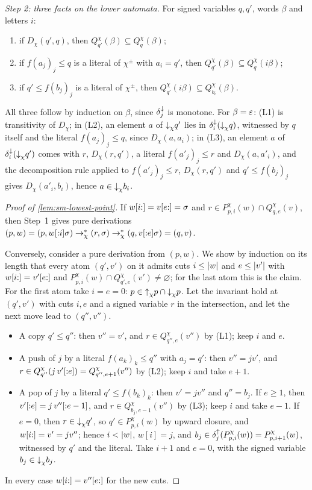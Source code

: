 \emph{Step 2: three facts on the lower automata.} For signed variables $q,q'$,
words $\beta$ and letters $i$:
\begin{enumerate}[label=(L\arabic*),leftmargin=*]
\item if $D_\chi(q',q)$, then $Q^\chi_{q'}(\beta)\subseteq Q^\chi_q(\beta)$;
\item if $f(a_j)_j\le q$ is a literal of $\chi^\pm$ with $a_i=q'$, then
  $Q^\chi_{q'}(\beta)\subseteq Q^\chi_q(i\beta)$;
\item if $q'\le f(b_j)_j$ is a literal of $\chi^\pm$, then
  $Q^\chi_{q'}(i\beta)\subseteq Q^\chi_{b_i}(\beta)$.
\end{enumerate}
All three follow by induction on $\beta$, since $\delta^{\downarrow}_{j}$ is monotone. For
$\beta=\varepsilon$: (L1) is transitivity of $D_\chi$; in (L2), an element $a$ of
$\mathord{\downarrow}_{\chi}{q'}$ lies in $\delta^{\downarrow}_{i}(\mathord{\downarrow}_{\chi} q)$, witnessed by $q$ itself and
the literal $f(a_j)_j\le q$, since $D_\chi(a,a_i)$; in (L3), an element $a$ of
$\delta^{\downarrow}_{i}(\mathord{\downarrow}_{\chi}{q'})$ comes with $r$, $D_\chi(r,q')$, a literal
$f(a'_j)_j\le r$ and $D_\chi(a,a'_i)$, and the decomposition rule applied to
$f(a'_j)_j\le r$, $D_\chi(r,q')$ and $q'\le f(b_j)_j$ gives
$D_\chi(a'_i,b_i)$, hence $a\in\mathord{\downarrow}_{\chi}{b_i}$.

\begin{proof}[Proof of \cref{lem:sm-lowest-point}]
If $w[i{:}]=v[e{:}]=\sigma$ and $r\in P^\chi_{p,i}(w)\cap Q^\chi_{q,e}(v)$,
then Step~1 gives pure derivations
$(p,w)=(p,w[{:}i]\sigma)\to^*_\chi(r,\sigma)\to^*_\chi(q,v[{:}e]\sigma)=(q,v)$.

Conversely, consider a pure derivation from $(p,w)$. We show by induction on
its length that every atom $(q',v')$ on it admits cuts $i\le\lvert w\rvert$ and
$e\le\lvert v'\rvert$ with $w[i{:}]=v'[e{:}]$ and
$P^\chi_{p,i}(w)\cap Q^\chi_{q',e}(v')\ne\varnothing$; for the last atom this
is the claim. For the first atom take $i=e=0$: $p\in\mathord{\uparrow}_{\chi} p\cap\mathord{\downarrow}_{\chi} p$.
Let the invariant hold at $(q',v')$ with cuts $i,e$ and a signed variable $r$
in the intersection, and let the next move lead to $(q'',v'')$.
\begin{itemize}[leftmargin=*]
\item A copy $q'\le q''$: then $v''=v'$, and $r\in Q^\chi_{q'',e}(v'')$ by
  (L1); keep $i$ and $e$.
\item A push of $j$ by a literal $f(a_k)_k\le q''$ with $a_j=q'$: then
  $v''=jv'$, and $r\in Q^\chi_{q''}(j\,v'[{:}e])=Q^\chi_{q'',e+1}(v'')$ by
  (L2); keep $i$ and take $e+1$.
\item A pop of $j$ by a literal $q'\le f(b_k)_k$: then $v'=jv''$ and
  $q''=b_j$. If $e\ge1$, then $v'[{:}e]=j\,v''[{:}e-1]$, and
  $r\in Q^\chi_{b_j,e-1}(v'')$ by (L3); keep $i$ and take $e-1$. If $e=0$,
  then $r\in\mathord{\downarrow}_{\chi}{q'}$, so $q'\in P^\chi_{p,i}(w)$ by upward closure, and
  $w[i{:}]=v'=jv''$; hence $i<\lvert w\rvert$, $w[i]=j$, and
  $b_j\in\delta^{\uparrow}_{j}(P^\chi_{p,i}(w))=P^\chi_{p,i+1}(w)$, witnessed by $q'$ and
  the literal. Take $i+1$ and $e=0$, with the signed variable
  $b_j\in\mathord{\downarrow}_{\chi}{b_j}$.
\end{itemize}
In every case $w[i{:}]=v''[e{:}]$ for the new cuts.
\end{proof}

